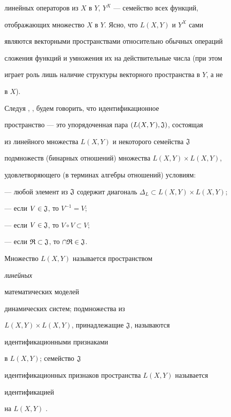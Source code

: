 линейных операторов из $X$ в $Y$, $Y^X$ --- семейство всех функций, 


отображающих множество $X$ в $Y$. Ясно, что $L(X,Y)$ и $Y^X$ сами 


являются векторными пространствами относительно обычных операций 


сложения функций и умножения их на действительные числа (при этом 


играет роль лишь наличие структуры векторного пространства в $Y$, а не 


в $X$). 


 


Следуя \cite{1}, \cite{2}, будем говорить, что идентификационное 


пространство --- это упорядоченная пара $(L(X,Y),\frak J)$, состоящая 


из линейного множества $L(X,Y)$ и некоторого семейства $\frak J$ 


подмножеств (бинарных отношений) множества $L(X,Y)\times L(X,Y)$, 


удовлетворяющего (в терминах алгебры отношений) условиям: 


 


--- любой элемент из $\frak J$ содержит диагональ $\Delta_L\subset 


L(X,Y)\times L(X,Y)$; 


 


--- если $V\in\frak J$, то $V^{-1}=V$; 


 


--- если $V\in\frak J$, то $V\circ V\subset V$; 


 


--- если $\frak R\subset\frak J$, то $\cap\frak R\in\frak J$. 


 


Множество $L(X,Y)$ называется пространством {\it линейных 


математических моделей} динамических систем; подмножества из 


$L(X,Y)\times L(X,Y)$, принадлежащие $\frak J$, называются {\it 


идентификационными признаками} в $L(X,Y)$; семейство $\frak J$ 


идентификационных признаков пространства $L(X,Y)$ называется {\it 


идентификацией} на $L(X,Y)$ \cite{1}. 


